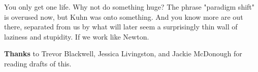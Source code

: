 You only get one life. Why not do
                  something huge? The phrase "paradigm shift" is overused now,
                  but Kuhn was onto something. And you know more are out there,
                  separated from us by what will later seem a surprisingly thin
                  wall of laziness and stupidity. If we work like Newton.







\textbf{Thanks}
                  to Trevor Blackwell, Jessica Livingston, and Jackie McDonough
                  for reading drafts of this.


              
            
          

